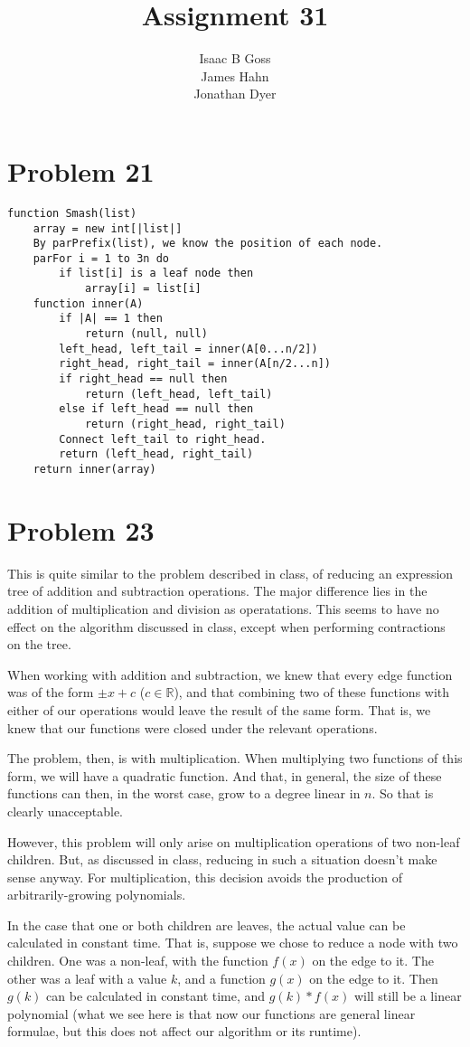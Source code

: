 \documentclass{article}
\author{Isaac B Goss\\ James Hahn\\ Jonathan Dyer}
\title{Assignment 31}
\providecommand{\prob}[1]{\section*{Problem #1}}
\providecommand{\R}{\mathbb{R}}
\begin{document}
\maketitle

\prob{21}

\begin{lstlisting}
function Smash(list)
    array = new int[|list|]
    By parPrefix(list), we know the position of each node.
    parFor i = 1 to 3n do
        if list[i] is a leaf node then
            array[i] = list[i]
    function inner(A)
        if |A| == 1 then
            return (null, null)
        left_head, left_tail = inner(A[0...n/2])
        right_head, right_tail = inner(A[n/2...n])
        if right_head == null then
            return (left_head, left_tail)
        else if left_head == null then
            return (right_head, right_tail)
        Connect left_tail to right_head.
        return (left_head, right_tail)
    return inner(array)
\end{lstlisting}

\prob{23}
This is quite similar to the problem described in class, of reducing an expression tree of addition and subtraction operations.
The major difference lies in the addition of multiplication and division as operatations.
This seems to have no effect on the algorithm discussed in class, except when performing contractions on the tree.

When working with addition and subtraction, we knew that every edge function was of the form $\pm x + c$ ($c \in \R$), and that combining two of these functions with either of our operations would leave the result of the same form.
That is, we knew that our functions were closed under the relevant operations.

The problem, then, is with multiplication.
When multiplying two functions of this form, we will have a quadratic function.
And that, in general, the size of these functions can then, in the worst case, grow to a degree linear in $n$.
So that is clearly unacceptable.

However, this problem will only arise on multiplication operations of two non-leaf children.
But, as discussed in class, reducing in such a situation doesn't make sense anyway.
For multiplication, this decision avoids the production of arbitrarily-growing polynomials.

In the case that one or both children are leaves, the actual value can be calculated in constant time.
That is, suppose we chose to reduce a node with two children.
One was a non-leaf, with the function $f(x)$ on the edge to it.
The other was a leaf with a value $k$, and a function $g(x)$ on the edge to it.
Then $g(k)$ can be calculated in constant time, and $g(k)*f(x)$ will still be a linear polynomial
(what we see here is that now our functions are general linear formulae, but this does not affect our algorithm or its runtime).
\end{document}
